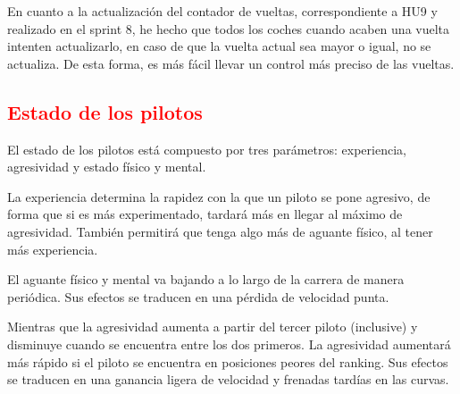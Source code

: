 En cuanto a la actualización del contador de vueltas, correspondiente a HU9 y realizado en el sprint 8, he hecho que todos los coches cuando acaben una vuelta intenten actualizarlo, en caso de que la vuelta actual sea mayor o igual, no se actualiza. De esta forma, es más fácil llevar un control más preciso de las vueltas.

\subsection{\textcolor{red}{Estado de los pilotos}}

El estado de los pilotos está compuesto por tres parámetros: experiencia, agresividad y estado físico y mental.

\bigskip

La experiencia determina la rapidez con la que un piloto se pone agresivo, de forma que si es más experimentado, tardará más en llegar al máximo de agresividad. También permitirá que tenga algo más de aguante físico, al tener más experiencia.

\bigskip

El aguante físico y mental va bajando a lo largo de la carrera de manera periódica. Sus efectos se traducen en una pérdida de velocidad punta.

\bigskip

Mientras que la agresividad aumenta a partir del tercer piloto (inclusive) y disminuye cuando se encuentra entre los dos primeros. La agresividad aumentará más rápido si el piloto se encuentra en posiciones peores del ranking. Sus efectos se traducen en una ganancia ligera de velocidad y frenadas tardías en las curvas.
